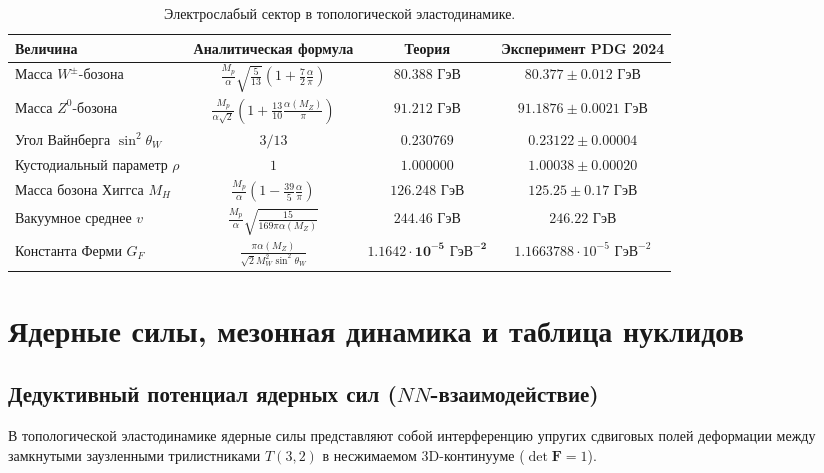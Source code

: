 \documentclass[11pt,a4paper,oneside]{article}
\theoremstyle{plain}
\theoremstyle{definition}
\theoremstyle{remark}
\numberwithin{equation}{section}
\begin{document}
	\begin{table}[h!]
		\centering
		\small
		\caption{Электрослабый сектор в топологической эластодинамике.}
		\label{tab:electroweak_summary}
		\begin{tabularx}{\textwidth}{lccc}
			\toprule
			\textbf{Величина} & \textbf{Аналитическая формула} & \textbf{Теория} & \textbf{Эксперимент PDG 2024} \\
			\midrule
			Масса $W^\pm$-бозона & $\frac{M_p}{\alpha}\sqrt{\frac{5}{13}}(1 + \frac{7}{2}\frac{\alpha}{\pi})$ & $\mathbf{80.388 \text{ ГэВ}}$ & $80.377 \pm 0.012 \text{ ГэВ}$ \\
			Масса $Z^0$-бозона & $\frac{M_p}{\alpha\sqrt{2}}(1 + \frac{13}{10}\frac{\alpha(M_Z)}{\pi})$ & $\mathbf{91.212 \text{ ГэВ}}$ & $91.1876 \pm 0.0021 \text{ ГэВ}$ \\
			Угол Вайнберга $\sin^2\theta_W$ & $3/13$ & $\mathbf{0.230769}$ & $0.23122 \pm 0.00004$ \\
			Кустодиальный параметр $\rho$ & $1$ & $\mathbf{1.000000}$ & $1.00038 \pm 0.00020$ \\
			Масса бозона Хиггса $M_H$ & $\frac{M_p}{\alpha}(1 - \frac{39}{5}\frac{\alpha}{\pi})$ & $\mathbf{126.248 \text{ ГэВ}}$ & $125.25 \pm 0.17 \text{ ГэВ}$ \\
			Вакуумное среднее $v$ & $\frac{M_p}{\alpha}\sqrt{\frac{15}{169\pi\alpha(M_Z)}}$ & $\mathbf{244.46 \text{ ГэВ}}$ & $246.22 \text{ ГэВ}$ \\
			Константа Ферми $G_F$ & $\frac{\pi\alpha(M_Z)}{\sqrt{2}M_W^2\sin^2\theta_W}$ & $\mathbf{1.1642 \cdot 10^{-5} \text{ ГэВ}^{-2}}$ & $1.1663788 \cdot 10^{-5} \text{ ГэВ}^{-2}$ \\
			\bottomrule
		\end{tabularx}
	\end{table}
	
\section{Ядерные силы, мезонная динамика и таблица нуклидов}

\subsection{Дедуктивный потенциал ядерных сил ($NN$-взаимодействие)}

В топологической эластодинамике ядерные силы представляют собой интерференцию упругих сдвиговых полей деформации между замкнутыми заузленными трилистниками $T(3,2)$ в несжимаемом 3D-континууме ($\det\mathbf{F}=1$).
\end{document}
